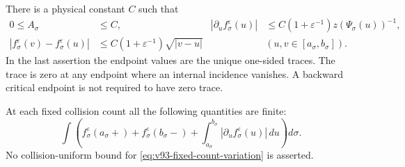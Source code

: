 \begin{theorem}
\label{thm:v93-traces}
There is a physical constant $C$ such that
\begin{align}
 0\le A_\sigma&\le C,&
 |\partial_u f_\sigma^\varepsilon(u)|
       &\le C(1+\varepsilon^{-1})z(\Psi_\sigma(u))^{-1},
                                                   \label{eq:v93-absolute-derivative}\\
 |f_\sigma^\varepsilon(v)-f_\sigma^\varepsilon(u)|
       &\le C(1+\varepsilon^{-1})\sqrt{|v-u|}
       &&(u,v\in[a_\sigma,b_\sigma]).              \label{eq:v93-sheet-holder}
\end{align}
In the last assertion the endpoint values are the unique one-sided
traces. The trace is zero at any endpoint where an internal incidence
vanishes. A backward critical endpoint is not required to have zero
trace.

At each fixed collision count all the following quantities are finite:
\begin{equation}\label{eq:v93-fixed-count-variation}
 \int\left(f_\sigma^\varepsilon(a_\sigma+)
       +f_\sigma^\varepsilon(b_\sigma-)
       +\int_{a_\sigma}^{b_\sigma}
                    |\partial_u f_\sigma^\varepsilon(u)|\,du\right)d\sigma.
\end{equation}
No collision-uniform bound for \eqref{eq:v93-fixed-count-variation}
is asserted.
\end{theorem}
